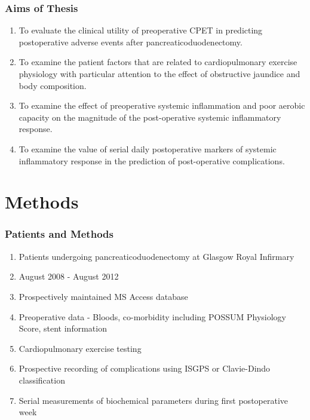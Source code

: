 \documentclass{beamer}
\begin{document}
\begin{frame}
	\frametitle{Aims of Thesis}
	\begin{enumerate}
		\item To evaluate the clinical utility of preoperative CPET in predicting postoperative adverse events after pancreaticoduodenectomy.
		\item To examine the patient factors that are related to cardiopulmonary exercise physiology with particular attention to the effect of obstructive jaundice and body composition.
		\item To examine the effect of preoperative systemic inflammation and poor aerobic capacity on the magnitude of the post-operative systemic inflammatory response.
		\item To examine the value of serial daily postoperative markers of systemic inflammatory response in the prediction of post-operative complications.
	\end{enumerate}
\end{frame}

\section{Methods}
\begin{frame}
	\frametitle{Patients and Methods}
	\begin{enumerate}
		\item Patients undergoing pancreaticoduodenectomy at Glasgow Royal Infirmary
		\item August 2008 - August 2012
		\item Prospectively maintained MS Access database
		\item Preoperative data - Bloods, co-morbidity including POSSUM Physiology Score, stent information
		\item Cardiopulmonary exercise testing
		\item Prospective recording of complications using ISGPS or Clavie-Dindo classification
		\item Serial measurements of biochemical parameters during first postoperative week
	\end{enumerate}
\end{frame}

\end{document}
